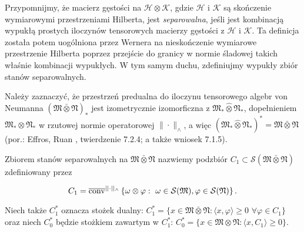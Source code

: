 Przypomnijmy, że macierz gęstości na $\mathcal{H}\otimes\mathcal{K}$,
gdzie $\mathcal{H}$ i $\mathcal{K}$
są skończenie wymiarowymi przestrzeniami Hilberta,
jest \emph{separowalna},
jeśli jest kombinacją wypukłą prostych iloczynów tensorowych macierzy gęstości
z $\mathcal{H}$ i $\mathcal{K}$.
Ta definicja została potem uogólniona przez Wernera \cite{werner1989quantum}
na nieskończenie wymiarowe przestrzenie Hilberta poprzez
przejście do granicy w normie śladowej takich właśnie kombinacji wypukłych.
W tym samym duchu, zdefiniujmy wypukły zbiór stanów separowalnych.

Należy zaznaczyć, że przestrzeń predualna do iloczynu tensorowego algebr von Neumanna
$(\mathfrak{M} \bar{\otimes} \mathfrak{N})_{*}$
jest izometrycznie izomorficzna z
$\mathfrak{M}_*\hat{\otimes}\mathfrak{N}_*$, dopełnieniem
$\mathfrak{M}_*\otimes\mathfrak{N}_*$ w rzutowej normie operatorowej
\label{def:projectiveoperatornorm}
$\|\cdot\|_\wedge$,
a więc $(\mathfrak{M}_*\hat{\otimes}\mathfrak{N}_*)^*= \mathfrak{M} \bar{\otimes} \mathfrak{N}$
(por.: Effros, Ruan \cite{Effros2000}, twierdzenie 7.2.4;
a także wniosek 7.1.5).

\begin{Definition}
Zbiorem stanów separowalnych na $\mathfrak{M} \bar{\otimes} \mathfrak{N}$
nazwiemy podzbiór
$C_{1} \subset \mathcal{S}(\mathfrak{M} \bar{\otimes} \mathfrak{N})$
zdefiniowany przez
\begin{linenomath*}
 \begin{equation}
    \label{def:SeparableStates234}
C_{1} = \overline{{\rm conv}}^{||\cdot||_{\wedge}}
\left \{\omega \otimes \varphi: \, \,\omega \in \mathcal{S}(\mathfrak{M}),
\varphi \in \mathcal{S}(\mathfrak{N})\right \}.
 \end{equation}
\end{linenomath*}
Niech także $C_{1}^{*}$ oznacza stożek dualny:
$C_{1}^{*} = \{ x \in \mathfrak{M} \bar{\otimes} \mathfrak{N}:
 \langle x , \varphi \rangle \geq 0 \,\, \forall \varphi \in C_{1} \}$ oraz
niech $C_{0}^{*}$ będzie stożkiem zawartym w
$C_{1}^{*}$:
$C_{0}^{*} = \{ x \in \mathfrak{M} \otimes \mathfrak{N}:\langle x , C_{1} \rangle \geq 0 \}$.
\end{Definition}


